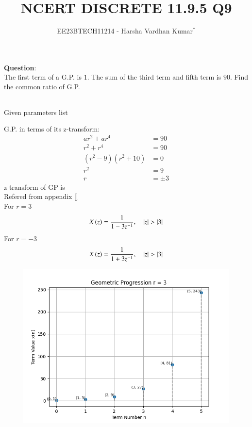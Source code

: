 \documentclass[journal,12pt,twocolumn]{IEEEtran}
\theoremstyle{remark}
\begin{document}

\vspace{3cm}
\title{NCERT DISCRETE 11.9.5 Q9}
\author{EE23BTECH11214 - Harsha Vardhan Kumar$^{*}$%
}
\maketitle
\newpage
\bigskip
\textbf{Question}:\\
The first term of a G.P. is $1$. The sum of the third term and fifth
term is $90$. Find the common ratio of G.P.
\\
\solution\\
\begin{table}[htbp]
\centering

\caption{Given parameters list}
\end{table}
G.P. in terms of its z-transform:
\begin{align}
ar^2 + ar^4 &= 90 \\
r^2 + r^4 &= 90 \\
(r^2 - 9)(r^2 + 10) &= 0 \\
r^2 &= 9 \\
r &= \pm 3
\end{align}
z transform of GP is \\
Refered from appendix \eqref{} \\
For $r = 3$
\begin{align}
X\left(z\right) = \frac{1}{1 - 3z^{-1}}  , \quad \left\vert z\right\vert > \left\vert3\right\vert
\end{align}
For $r = -3$
\begin{align}
X\left(z\right) = \frac{1}{1 + 3z^{-1}}  , \quad \left\vert z\right\vert > \left\vert3\right\vert
\end{align}
\begin{figure}
   \centering
     \includegraphics[width=1\columnwidth, height=1\columnwidth]{figs/graph.png}
     \caption{}
\end{figure}
\end{document}
